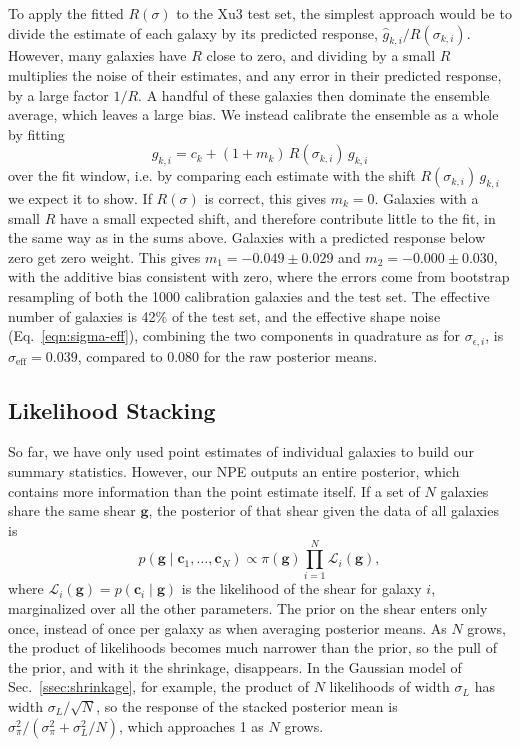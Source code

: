 To apply the fitted $R(\sigma)$ to the Xu3 test set, the simplest approach would be to divide the estimate of each galaxy by its predicted response, $\hat{g}_{k,i}/R(\sigma_{k,i})$. However, many galaxies have $R$ close to zero, and dividing by a small $R$ multiplies the noise of their estimates, and any error in their predicted response, by a large factor $1/R$. A handful of these galaxies then dominate the ensemble average, which leaves a large bias. We instead calibrate the ensemble as a whole by fitting
\begin{equation}
\label{eqn:ensemble-calibration}
    \hat{g}_{k,i} = c_k + (1+m_k)\, R(\sigma_{k,i})\, g_{k,i}
\end{equation}
over the fit window, i.e. by comparing each estimate with the shift $R(\sigma_{k,i})\,g_{k,i}$ we expect it to show. If $R(\sigma)$ is correct, this gives $m_k = 0$. Galaxies with a small $R$ have a small expected shift, and therefore contribute little to the fit, in the same way as in the sums above. Galaxies with a predicted response below zero get zero weight. This gives $m_1 = -0.049 \pm 0.029$ and $m_2 = -0.000 \pm 0.030$, with the additive bias consistent with zero, where the errors come from bootstrap resampling of both the 1000 calibration galaxies and the test set. The effective number of galaxies is 42\% of the test set, and the effective shape noise (Eq.~\ref{eqn:sigma-eff}), combining the two components in quadrature as for $\sigma_{\epsilon,i}$, is $\sigma_\mathrm{eff} = 0.039$, compared to 0.080 for the raw posterior means.

\subsection{Likelihood Stacking}
\label{ssec:stacking}

So far, we have only used point estimates of individual galaxies to build our summary statistics. However, our NPE outputs an entire posterior, which contains more information than the point estimate itself. If a set of $N$ galaxies share the same shear $\mathbf{g}$, the posterior of that shear given the data of all galaxies is \citep{BA14}
\begin{equation}
\label{eqn:stack}
    p(\mathbf{g} \mid \mathbf{c}_1, \dots, \mathbf{c}_N) \propto \pi(\mathbf{g}) \prod_{i=1}^{N} \mathcal{L}_i(\mathbf{g}),
\end{equation}
where $\mathcal{L}_i(\mathbf{g}) = p(\mathbf{c}_i \mid \mathbf{g})$ is the likelihood of the shear for galaxy $i$, marginalized over all the other parameters. The prior on the shear enters only once, instead of once per galaxy as when averaging posterior means. As $N$ grows, the product of likelihoods becomes much narrower than the prior, so the pull of the prior, and with it the shrinkage, disappears. In the Gaussian model of Sec.~\ref{ssec:shrinkage}, for example, the product of $N$ likelihoods of width $\sigma_L$ has width $\sigma_L/\sqrt{N}$, so the response of the stacked posterior mean is $\sigma_\pi^2/(\sigma_\pi^2 + \sigma_L^2/N)$, which approaches 1 as $N$ grows.

